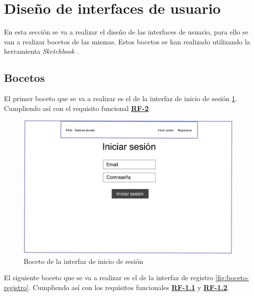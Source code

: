 \newpage

\section{Diseño de interfaces de usuario}
En esta sección se va a realizar el diseño de las interfaces de usuario, para
ello se van a realizar bocetos de las mismas. Estos bocetos se han realizado
utilizando la herramienta \textit{Sketchbook} \cite{sketchbook}.

\subsection{Bocetos}
El primer boceto que se va a realizar es el de la interfaz de inicio de sesión
\ref{fig:boceto-iniciar-sesion}. Cumpliendo así con el requisito funcional
\hyperref[tab:rf-2]{\textbf{RF-2}}.

\begin{figure}[H]
  \centering
  \includegraphics[width=\textwidth]{img/iniciar-sesion}
  \caption{Boceto de la interfaz de inicio de sesión}
  \label{fig:boceto-iniciar-sesion}
\end{figure}

\newpage

El siguiente boceto que se va a realizar es el de la interfaz de registro
\ref{fig:boceto-registro}. Cumpliendo así con los requisitos funcionales
\hyperref[tab:rf-1-1]{\textbf{RF-1.1}} y \hyperref[tab:rf-1-2]{\textbf{RF-1.2}}.

